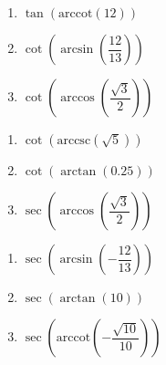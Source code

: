 \documentclass{ximera}
\begin{document}
\begin{multicols}{3}

\begin{enumerate}

\setcounter{enumi}{\value{HW}}

\item  $\tan\left(\text{arccot}\left( 12  \right)\right)$ 
\item  $\cot\left(\arcsin\left(\dfrac{12}{13}\right)\right)$ 
\item  $\cot\left(\arccos\left(\dfrac{\sqrt{3}}{2}\right)\right)$

\setcounter{HW}{\value{enumi}}

\end{enumerate}

\end{multicols}

\begin{multicols}{3}

\begin{enumerate}

\setcounter{enumi}{\value{HW}}

\item  $\cot\left(\text{arccsc}\left(\sqrt{5}\right)\right)$ 
\item  $\cot\left(\arctan \left( 0.25 \right)\right)$ 
\item  $\sec\left(\arccos\left(\dfrac{\sqrt{3}}{2}\right)\right)$

\setcounter{HW}{\value{enumi}}

\end{enumerate}

\end{multicols}

\begin{multicols}{3}

\begin{enumerate}

\setcounter{enumi}{\value{HW}}

\item  $\sec\left(\arcsin\left(-\dfrac{12}{13}\right)\right)$ 
\item  $\sec\left(\arctan\left(10\right)\right)$ 
\item  $\sec\left(\text{arccot}\left(-\dfrac{\sqrt{10}}{10}\right)\right)$

\setcounter{HW}{\value{enumi}}

\end{enumerate}

\end{multicols}
\end{document}
